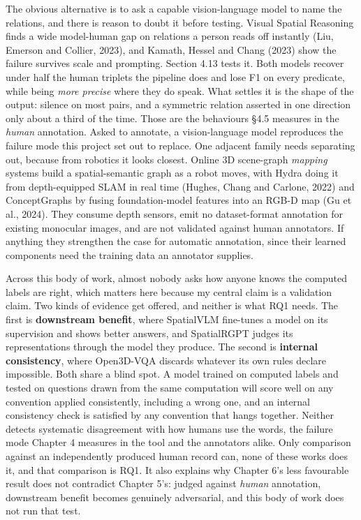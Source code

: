 The obvious alternative is to ask a capable vision-language model to name the relations, and there is reason to doubt it before testing. Visual Spatial Reasoning finds a wide model-human gap on relations a person reads off instantly (Liu, Emerson and Collier, 2023), and Kamath, Hessel and Chang (2023) show the failure survives scale and prompting. Section 4.13 tests it. Both models recover under half the human triplets the pipeline does and lose F1 on every predicate, while being \textit{more precise} where they do speak. What settles it is the shape of the output: silence on most pairs, and a symmetric relation asserted in one direction only about a third of the time. Those are the behaviours \S{}4.5 measures in the \textit{human} annotation. Asked to annotate, a vision-language model reproduces the failure mode this project set out to replace. One adjacent family needs separating out, because from robotics it looks closest. Online 3D scene-graph \textit{mapping} systems build a spatial-semantic graph as a robot moves, with Hydra doing it from depth-equipped SLAM in real time (Hughes, Chang and Carlone, 2022) and ConceptGraphs by fusing foundation-model features into an RGB-D map (Gu et al., 2024). They consume depth sensors, emit no dataset-format annotation for existing monocular images, and are not validated against human annotators. If anything they strengthen the case for automatic annotation, since their learned components need the training data an annotator supplies.

Across this body of work, almost nobody asks how anyone knows the computed labels are right, which matters here because my central claim is a validation claim. Two kinds of evidence get offered, and neither is what RQ1 needs. The first is \textbf{downstream benefit}, where SpatialVLM fine-tunes a model on its supervision and shows better answers, and SpatialRGPT judges its representations through the model they produce. The second is \textbf{internal consistency}, where Open3D-VQA discards whatever its own rules declare impossible. Both share a blind spot. A model trained on computed labels and tested on questions drawn from the same computation will score well on any convention applied consistently, including a wrong one, and an internal consistency check is satisfied by any convention that hangs together. Neither detects systematic disagreement with how humans use the words, the failure mode Chapter 4 measures in the tool and the annotators alike. Only comparison against an independently produced human record can, none of these works does it, and that comparison is RQ1. It also explains why Chapter 6's less favourable result does not contradict Chapter 5's: judged against \textit{human} annotation, downstream benefit becomes genuinely adversarial, and this body of work does not run that test.

